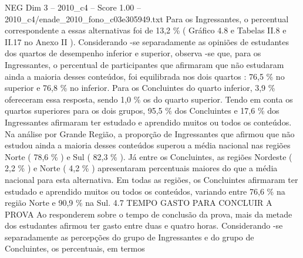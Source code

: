 \begin{textsample}{NEG Dim 3 – 2010\_c4 – Score 1.00 – 2010\_c4/enade\_2010\_fono\_c03e305949.txt}
Para os Ingressantes, o percentual correspondente a essas alternativas foi de 13,2 \% ( Gráfico 4.8 e Tabelas II.8 e II.17 no Anexo II ).
Considerando -se separadamente as opiniões de estudantes dos quartos de desempenho inferior e superior, observa -se que, para os Ingressantes, o percentual de participantes que afirmaram que não estudaram ainda a maioria desses conteúdos, foi equilibrada nos dois quartos : 76,5 \% no superior e 76,8 \% no inferior.
Para os Concluintes do quarto inferior, 3,9 \% ofereceram essa resposta, sendo 1,0 \% os do quarto superior.
Tendo em conta os quartos superiores para os dois grupos, 95,5 \% dos Concluintes e 17,6 \% dos Ingressantes afirmaram ter estudado e aprendido muitos ou todos os conteúdos.
Na análise por Grande Região, a proporção de Ingressantes que afirmou que não estudou ainda a maioria desses conteúdos superou a média nacional nas regiões Norte ( 78,6 \% ) e Sul ( 82,3 \% ).
Já entre os Concluintes, as regiões Nordeste ( 2,2 \% ) e Norte ( 4,2 \% ) apresentaram percentuais maiores do que a média nacional para esta alternativa.
Em todas as regiões, os Concluintes afirmaram ter estudado e aprendido muitos ou todos os conteúdos, variando entre 76,6 \% na região Norte e 90,9 \% na Sul. 4.7 TEMPO GASTO PARA CONCLUIR A PROVA Ao responderem sobre o tempo de conclusão da prova, mais da metade dos estudantes afirmou ter gasto entre duas e quatro horas.
Considerando -se separadamente as percepções do grupo de Ingressantes e do grupo de Concluintes, os percentuais, em termos

\end{textsample}
